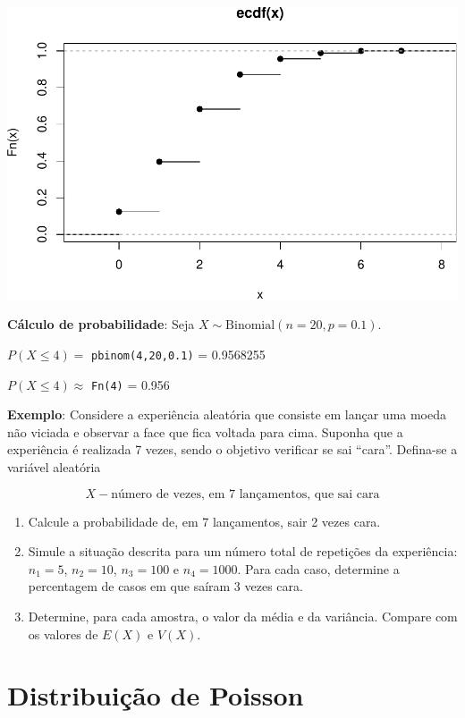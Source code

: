 \documentclass[
]{book}
\begin{document}
\includegraphics{introR_files/figure-latex/unnamed-chunk-251-2.pdf}

\textbf{Cálculo de probabilidade}: Seja \(X \sim \text{Binomial}(n=20, p=0.1)\).

\(P(X \leq 4) =\) \texttt{pbinom(4,20,0.1)} = 0.9568255

\(P(X \leq 4) \approx\) \texttt{Fn(4)} = 0.956

\textbf{Exemplo}: Considere a experiência aleatória que consiste em lançar
uma moeda não viciada e observar a face que fica voltada para cima.
Suponha que a experiência é realizada 7 vezes, sendo o objetivo
verificar se sai ``cara''. Defina-se a variável aleatória

\[X - \text{número de vezes, em 7 lançamentos, que sai cara}\]

\begin{enumerate}
\def\labelenumi{(\alph{enumi})}
\item
  Calcule a probabilidade de, em 7 lançamentos, sair 2 vezes cara.
\item
  Simule a situação descrita para um número total de repetições da
  experiência: \(n_1=5\), \(n_2=10\), \(n_3=100\) e \(n_4=1000\). Para cada
  caso, determine a percentagem de casos em que saíram 3 vezes cara.
\item
  Determine, para cada amostra, o valor da média e da variância.
  Compare com os valores de \(E(X)\) e \(V(X)\).
\end{enumerate}

\section{Distribuição de Poisson}\label{distribuiuxe7uxe3o-de-poisson}
\end{document}
